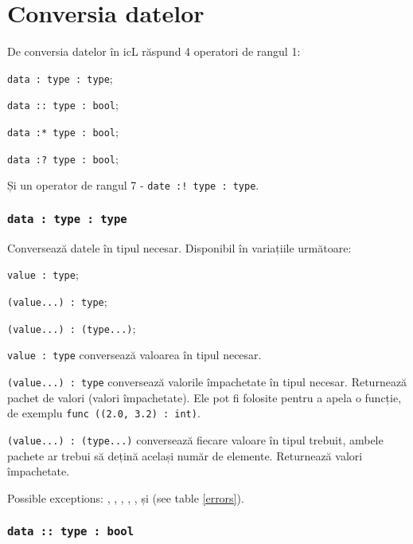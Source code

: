 \section{Conversia datelor}

De conversia datelor în icL răspund 4 operatori de rangul 1:
\begin{icItems}
	\item \texttt{data : type : type};
	\item \texttt{data :: type : bool};
	\item \texttt{data :* type : bool};
	\item \texttt{data :? type : bool};
\end{icItems}

Și un operator de rangul 7 - \texttt{date :! type : type}.

\subsubsection{\texttt{data : type : type}}

Conversează datele în tipul necesar. Disponibil în variațiile următoare:
\begin{icItems}
	\item \texttt{value : type};
	\item \texttt{(value...) : type};
	\item \texttt{(value...) : (type...)};
\end{icItems}

\texttt{value : type} conversează valoarea în tipul necesar.

\texttt{(value...) : type} conversează valorile împachetate în tipul necesar. Returnează pachet de valori (valori împachetate). Ele pot fi folosite pentru a apela o funcție, de exemplu \texttt{func ((2.0, 3.2) : int)}.

\texttt{(value...) : (type...)} conversează fiecare valoare în tipul trebuit, ambele pachete ar trebui să dețină același număr de elemente. Returnează valori împachetate.

Possible exceptions: , , , , ,  și  (see table \ref{errors}).

\subsubsection{\texttt{data :: type : bool}}

